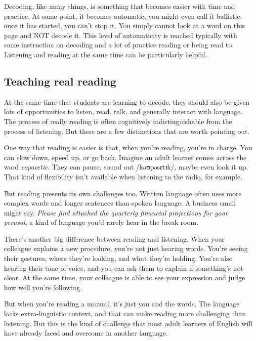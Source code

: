 Decoding, like many things, is something that becomes easier with time and practice. At some point, it becomes automatic, you might even call it ballistic: once it has started, you can't stop it. You simply cannot look at a word on this page and NOT decode it. This level of automaticity is reached typically with some instruction on decoding and a lot of practice reading or being read to. Listening and reading at the same time can be particularly helpful.

\subsection{Teaching real reading}

At the same time that students are learning to decode, they should also be given lots of opportunities to listen, read, talk, and generally interact with language. The process of really reading is often cognitively indistinguishable from the process of listening. But there are a few distinctions that are worth pointing out.

One way that reading is easier is that, when you're reading, you're in charge. You can slow down, speed up, or go back. Imagine an adult learner comes across the word \textit{copacetic}. They can pause, sound out /kəʊpəsɛtɪk/, maybe even look it up. That kind of flexibility isn't available when listening to the radio, for example.

But reading presents its own challenges too. Written language often uses more complex words and longer sentences than spoken language. A business email might say, \textit{Please find attached the quarterly financial projections for your perusal,} a kind of language you'd rarely hear in the break room.

There's another big difference between reading and listening. When your colleague explains a new procedure, you're not just hearing words. You're seeing their gestures, where they're looking, and what they're holding. You're also hearing their tone of voice, and you can ask them to explain if something's not clear. At the same time, your colleague is able to see your expression and judge how well you're following.

But when you're reading a manual, it's just you and the words. The language lacks extra-linguistic context, and that can make reading more challenging than listening. But this is the kind of challenge that most adult learners of English will have already faced and overcome in another language.

